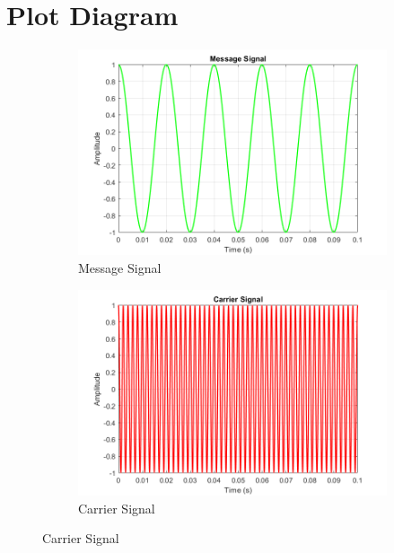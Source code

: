 \documentclass[a4paper,12pt]{article}
\begin{document}
	\section{Plot Diagram}
	\begin{figure}[H]
		\centering
		\begin{subfigure}[t]{0.49\textwidth}
			\centering
			\includegraphics[width=1\linewidth]{Images/1}
			\caption{Message Signal}
			\vspace{0.1cm}
		\end{subfigure}
		\hfil
		\begin{subfigure}[t]{0.49\textwidth}
			\centering
			\includegraphics[width=1\linewidth]{Images/2}
			\caption{ Carrier Signal}
		\end{subfigure}
		

\end{figure}
\end{document}
